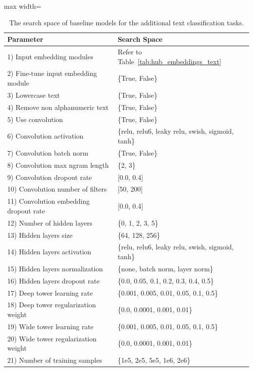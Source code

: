 \begin{table}[ht]
\centering
\begin{adjustbox}{max width=\textwidth}
\begin{tabular}{ll}
\toprule
\bf Parameter  & \bf Search Space \\
\midrule
1) Input embedding modules & Refer to Table~\ref{tab:hub_embeddings_text} \\
2) Fine-tune input embedding module & \{True, False\} \\
3) Lowercase text & \{True, False\} \\
4) Remove non alphanumeric text & \{True, False\} \\
5) Use convolution & \{True, False\} \\
6) Convolution activation & \{relu, relu6, leaky relu, swish, sigmoid, tanh\} \\
7) Convolution batch norm & \{True, False\} \\
8) Convolution max ngram length & \{2, 3\} \\
9) Convolution dropout rate & [0.0, 0.4] \\
10) Convolution number of filters & [50, 200]\\
11) Convolution embedding dropout rate & [0.0, 0.4] \\
12) Number of hidden layers & \{0, 1, 2, 3, 5\} \\
13) Hidden layers size & \{64, 128, 256\} \\
14) Hidden layers activation & \{relu, relu6, leaky relu, swish, sigmoid, tanh\} \\
15) Hidden layers normalization & \{none, batch norm, layer norm\} \\
16) Hidden layers dropout rate & \{0.0, 0.05, 0.1, 0.2, 0.3, 0.4, 0.5\} \\
17) Deep tower learning rate & \{0.001, 0.005, 0.01, 0.05, 0.1, 0.5\} \\
18) Deep tower regularization weight & \{0.0, 0.0001, 0.001, 0.01\} \\
19) Wide tower learning rate & \{0.001, 0.005, 0.01, 0.05, 0.1, 0.5\} \\
20) Wide tower regularization weight & \{0.0, 0.0001, 0.001, 0.01\} \\
21) Number of training samples & \{1e5, 2e5, 5e5, 1e6, 2e6\} \\
\bottomrule
\end{tabular}
\end{adjustbox}
\caption{The search space of baseline models for the additional text classification tasks.}
\label{tab:hub_ss}
\end{table}


